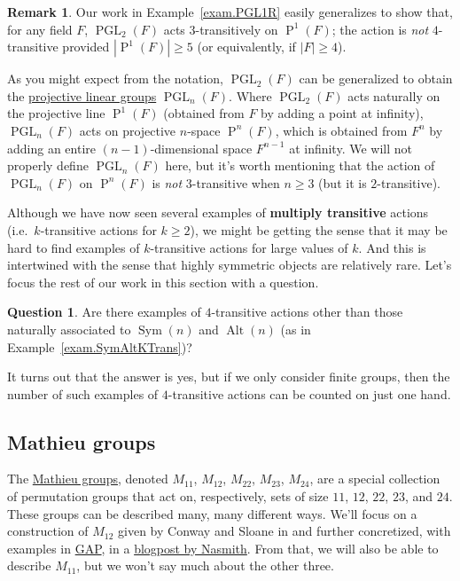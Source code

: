 \documentclass[11pt]{amsart}
\theoremstyle{plain}
\theoremstyle{definition}
\newtheorem*{remark*}{Remark}
\newtheorem*{question*}{Question}
\theoremstyle{remark}
\DeclareMathOperator{\Sym}{Sym}
\DeclareMathOperator{\Alt}{Alt}
\DeclareMathOperator{\PGL}{PGL}
\DeclareMathOperator{\Proj}{P}
\begin{document}
\begin{remark*}
Our work in Example~\ref{exam.PGL1R} easily generalizes to show that, for any field $F$,  $\PGL_2(F)$ acts $3$-transitively on $\Proj^1(F)$; the action is \emph{not} $4$-transitive provided $|\Proj^1(F)| \ge 5$ (or equivalently, if $|F| \ge 4$). 
\end{remark*}

As you might expect from the notation, $\PGL_2(F)$ can be generalized to obtain the \href{https://en.wikipedia.org/wiki/Projective_linear_group}{projective linear groups} $\PGL_n(F)$. Where $\PGL_2(F)$ acts naturally on the projective line $\Proj^1(F)$ (obtained from $F$ by adding a point at infinity), $\PGL_n(F)$ acts on projective $n$-space $\Proj^n(F)$, which is obtained from $F^n$ by adding an entire $(n-1)$-dimensional space $F^{n-1}$ at infinity. We will not properly define $\PGL_n(F)$ here, but it's worth mentioning  that the action of $\PGL_n(F)$ on $\Proj^n(F)$ is \emph{not} $3$-transitive when $n\ge 3$ (but it is $2$-transitive).

Although we have now seen several examples  of \textbf{multiply transitive} actions (i.e.~$k$-transitive actions for $k\ge 2$), we might be getting the sense that it may be hard to find examples of $k$-transitive actions for large values of $k$. And this is intertwined with the sense that highly symmetric objects are relatively rare. Let's focus the rest of our work in this section with a question. 

\begin{question*}
Are there examples of $4$-transitive actions other than those naturally associated to $\Sym(n)$ and $\Alt(n)$ (as in Example~\ref{exam.SymAltKTrans})? %
\end{question*}

It turns out that the answer is yes, but if we only consider finite groups, then the number of such examples of $4$-transitive actions can be counted on just one hand.

\subsection{Mathieu groups}

The \href{https://en.wikipedia.org/wiki/Mathieu_group}{Mathieu groups},  denoted $M_{11}$, $M_{12}$, $M_{22}$, $M_{23}$, $M_{24}$, are a special collection of  permutation groups that act on, respectively, sets of size $11$, $12$, $22$, $23$, and $24$. These groups can be described many, many different ways. We'll focus on a construction of $M_{12}$ given by Conway and Sloane in \cite{CoSl99} and further concretized, with examples in \href{https://www.gap-system.org}{GAP}, in a \href{https://www.cantorsparadise.com/the-rubiks-icosahedron-and-the-mathieu-group-m12-444ae64d1ac8}{blogpost by Nasmith}. From that, we will also be able to describe $M_{11}$, but we won't say much about the other three.
\end{document}
